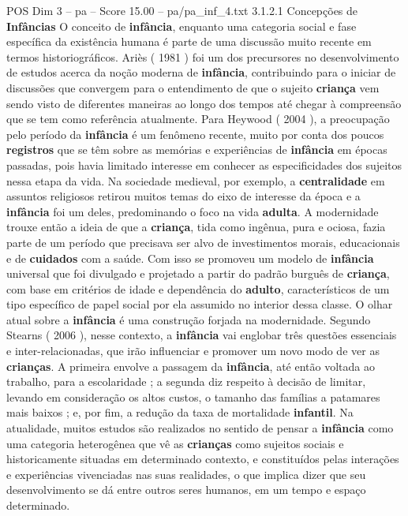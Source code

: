 \begin{textsample}{POS Dim 3 – pa – Score 15.00 – pa/pa\_inf\_4.txt}  \label{ex:f3_pos_235}
3.1.2.1 Concepções de \textbf{Infâncias} O conceito de \textbf{infância}, enquanto uma categoria social e fase específica da existência humana é parte de uma discussão muito recente em termos historiográficos.
Ariès ( 1981 ) foi um dos precursores no desenvolvimento de estudos acerca da noção moderna de \textbf{infância}, contribuindo para o iniciar de discussões que convergem para o entendimento de que o sujeito \textbf{criança} vem sendo visto de diferentes maneiras ao longo dos tempos até chegar à compreensão que se tem como referência atualmente.
Para Heywood ( 2004 ), a preocupação pelo período da \textbf{infância} é um fenômeno recente, muito por conta dos poucos \textbf{registros} que se têm sobre as memórias e experiências de \textbf{infância} em épocas passadas, pois havia limitado interesse em conhecer as especificidades dos sujeitos nessa etapa da vida.
Na sociedade medieval, por exemplo, a \textbf{centralidade} em assuntos religiosos retirou muitos temas do eixo de interesse da época e a \textbf{infância} foi um deles, predominando o foco na vida \textbf{adulta}.
A modernidade trouxe então a ideia de que a \textbf{criança}, tida como ingênua, pura e ociosa, fazia parte de um período que precisava ser alvo de investimentos morais, educacionais e de \textbf{cuidados} com a saúde.
Com isso se promoveu um modelo de \textbf{infância} universal que foi divulgado e projetado a partir do padrão burguês de \textbf{criança}, com base em critérios de idade e dependência do \textbf{adulto}, característicos de um tipo específico de papel social por ela assumido no interior dessa classe.
O olhar atual sobre a \textbf{infância} é uma construção forjada na modernidade.
Segundo Stearns ( 2006 ), nesse contexto, a \textbf{infância} vai englobar três questões essenciais e inter-relacionadas, que irão influenciar e promover um novo modo de ver as \textbf{crianças}.
A primeira envolve a passagem da \textbf{infância}, até então voltada ao trabalho, para a escolaridade ; a segunda diz respeito à decisão de limitar, levando em consideração os altos custos, o tamanho das famílias a patamares mais baixos ; e, por fim, a redução da taxa de mortalidade \textbf{infantil}.
Na atualidade, muitos estudos são realizados no sentido de pensar a \textbf{infância} como uma categoria heterogênea que vê as \textbf{crianças} como sujeitos sociais e historicamente situadas em determinado contexto, e constituídos pelas interações e experiências vivenciadas nas suas realidades, o que implica dizer que seu desenvolvimento se dá entre outros seres humanos, em um tempo e espaço determinado.

\end{textsample}
